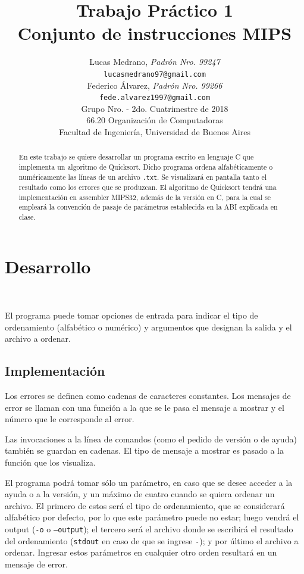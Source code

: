\documentclass[a4paper, 12pt]{article}
\title{		\textbf{Trabajo Práctico 1}\\
			\textbf{Conjunto de instrucciones MIPS}
			}
\author{	Lucas Medrano, \textit{Padrón Nro. 99247}                     	\\
            \texttt{ lucasmedrano97@gmail.com }                           		\\
            Federico Álvarez, \textit{Padrón Nro. 99266}                 	\\
            \texttt{ fede.alvarez1997@gmail.com }                                 	\\[2.5ex]
            \normalsize{Grupo Nro. \quad - 2do. Cuatrimestre de 2018}      	\\
            \normalsize{66.20 Organización de Computadoras}               	\\
            \normalsize{Facultad de Ingeniería, Universidad de Buenos Aires}\\
       }
\date{}
\begin{document}
	\lstset{inputencoding=utf8/latin1} %
	\maketitle
	\thispagestyle{empty}
	\begin{abstract}
		En este trabajo se quiere desarrollar un programa escrito en lenguaje C que implementa un algoritmo de Quicksort. Dicho programa ordena alfabéticamente o numéricamente las líneas de un archivo \texttt{.txt}. Se visualizará en pantalla tanto el resultado como los errores que se produzcan. El algoritmo de Quicksort tendrá una implementación en assembler MIPS32, además de la versión en C, para la cual se empleará la convención de pasaje de parámetros establecida en la ABI explicada en clase.
	\end{abstract}
	
	\pagebreak
	\thispagestyle{empty}
	\tableofcontents
	\newpage
	
	\setcounter{page}{1}
	
	\section{Desarrollo}
	\
	
		El programa puede tomar opciones de entrada para indicar el tipo de ordenamiento (alfabético o numérico) y argumentos que designan la salida y el archivo a ordenar.
		
	\subsection{Implementación}
		
		Los errores se definen como cadenas de caracteres constantes. Los mensajes de error se llaman con una función a la que se le pasa el mensaje a mostrar y el número que le corresponde al error.
		
		Las invocaciones a la línea de comandos (como el pedido de versión o de ayuda) también se guardan en cadenas. El tipo de mensaje a mostrar es pasado a la función que los visualiza.
		
		El programa podrá tomar sólo un parámetro, en caso que se desee acceder a la ayuda o a la versión, y un máximo de cuatro cuando se quiera ordenar un archivo. El primero de estos será el tipo de ordenamiento, que se considerará alfabético por defecto, por lo que este parámetro puede no estar; luego vendrá el output (\texttt{-o} o \texttt{--output}); el tercero será el archivo donde se escribirá el resultado del ordenamiento (\texttt{stdout} en caso de que se ingrese \texttt{-}); y por último el archivo a ordenar. Ingresar estos parámetros en cualquier otro orden resultará en un mensaje de error.
		
\end{document}

